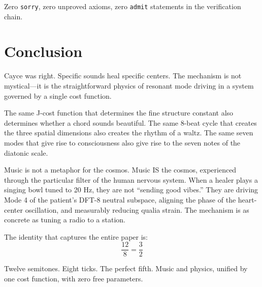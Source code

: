 \documentclass[11pt,a4paper]{article}
\begin{document}
Zero \texttt{sorry}, zero unproved axioms, zero \texttt{admit} statements in the verification chain.

\section{Conclusion}

Cayce was right. Specific sounds heal specific centers. The mechanism is not mystical---it is the straightforward physics of resonant mode driving in a system governed by a single cost function.

The same J-cost function that determines the fine structure constant also determines whether a chord sounds beautiful. The same 8-beat cycle that creates the three spatial dimensions also creates the rhythm of a waltz. The same seven modes that give rise to consciousness also give rise to the seven notes of the diatonic scale.

Music is not a metaphor for the cosmos. Music IS the cosmos, experienced through the particular filter of the human nervous system. When a healer plays a singing bowl tuned to 20 Hz, they are not ``sending good vibes.'' They are driving Mode 4 of the patient's DFT-8 neutral subspace, aligning the phase of the heart-center oscillation, and measurably reducing qualia strain. The mechanism is as concrete as tuning a radio to a station.

The identity that captures the entire paper is:
\[
\frac{12}{8} = \frac{3}{2}
\]

Twelve semitones. Eight ticks. The perfect fifth. Music and physics, unified by one cost function, with zero free parameters.
\end{document}
